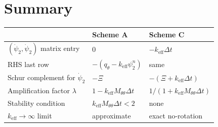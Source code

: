 \documentclass[11pt]{article}
\newcommand{\dt}{\Delta t}
\newcommand{\keff}{k_\mathrm{eff}}
\newcommand{\Mtt}{M_{\theta\theta}}
\begin{document}
\section{Summary}

\begin{center}
\begin{tabular}{@{}lll@{}}
\toprule
 & Scheme A & Scheme C \\
\midrule
$(\dot\psi_2,\dot\psi_2)$ matrix entry  & $0$
  & $-\keff\dt$ \\
RHS last row  & $-(q_\theta-\keff\psi_2^n)$ & same \\
Schur complement for $\dot\psi_2$  & $-\Xi$
  & $-(\Xi+\keff\dt)$ \\
Amplification factor $\lambda$ & $1-\keff\Mtt\dt$
  & $1/(1+\keff\Mtt\dt)$ \\
Stability condition  & $\keff\Mtt\dt < 2$ & none \\
$\keff\to\infty$ limit  & approximate & exact no-rotation \\
\bottomrule
\end{tabular}
\end{center}
\end{document}
